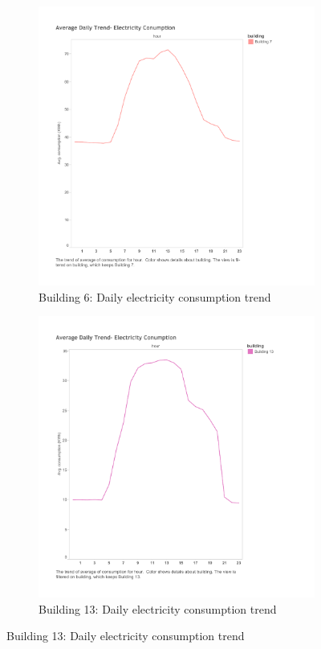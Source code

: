 \begin{figure}
        \centering
        \begin{subfigure}[b]{0.45\textwidth}
                \includegraphics[width=\textwidth]{images/db6_elec.pdf}
                \caption{Building 6: Daily electricity consumption trend}
                \label{fig:elec6}
        \end{subfigure}%
        \begin{subfigure}[b]{0.45\textwidth}
                \includegraphics[width=\textwidth]{images/db13_elec.pdf}
                \caption{Building 13: Daily electricity consumption trend}
                \label{fig:elec13}
        \end{subfigure}
        

\end{figure}
